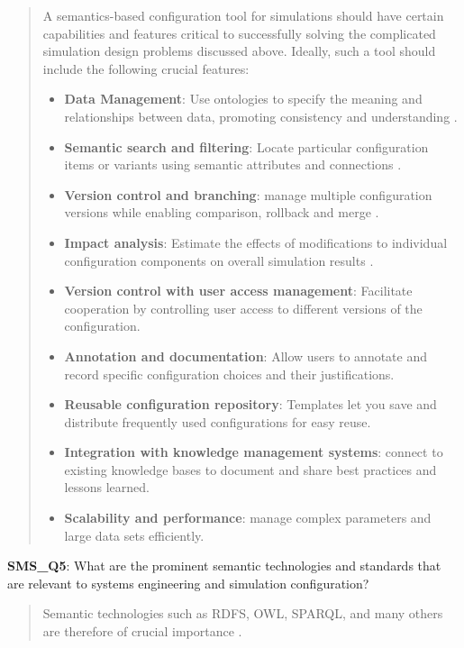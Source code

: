             \begin{quote}
                A semantics-based configuration tool for simulations should have certain capabilities and features critical to successfully solving the complicated simulation design problems discussed above. Ideally, such a tool should include the following crucial features:
                \begin{itemize}
                    \item \textbf{Data Management}: Use ontologies to specify the meaning and relationships between data, promoting consistency and understanding \cite{benjamin2006using}.
                    \item \textbf{Semantic search and filtering}: Locate particular configuration items or variants using semantic attributes and connections \cite{abad2021semankey}.
                    \item \textbf{Version control and branching}: manage multiple configuration versions while enabling comparison, rollback and merge \cite{na2016development, spelten2023simulation}.
                    \item \textbf{Impact analysis}: Estimate the effects of modifications to individual configuration components on overall simulation results \cite{na2016development}.
                    \item \textbf{Version control with user access management}: Facilitate cooperation by controlling user access to different versions of the configuration.
                    \item \textbf{Annotation and documentation}: Allow users to annotate and record specific configuration choices and their justifications.
                    \item \textbf{Reusable configuration repository}: Templates let you save and distribute frequently used configurations for easy reuse.
                    \item \textbf{Integration with knowledge management systems}: connect to existing knowledge bases to document and share best practices and lessons learned.
                    \item \textbf{Scalability and performance}: manage complex parameters and large data sets efficiently.\\
                \end{itemize}
            \end{quote}

            \textbf{SMS\_Q5}: What are the prominent semantic technologies and standards that are relevant to systems engineering and simulation configuration?
            \begin{quote}
                Semantic technologies such as RDFS, OWL, SPARQL, and many others are therefore of crucial importance \cite{benjamin2006using}.\\
            \end{quote}

